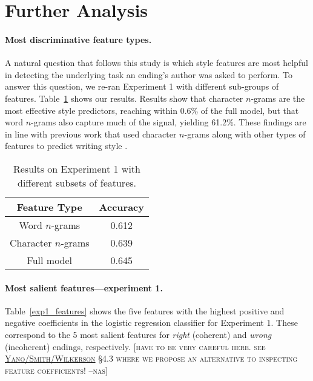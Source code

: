 \documentclass[11pt,a4paper]{article}
\newcommand{\tabref}[1]{Table~\ref{#1}}
\newcommand{\isection}[2]{\section{#1}\label{ssec:#2}}
\newcommand{\resolved}[1]{}
\newcommand{\nascomment}[1]{{\color{blue}\textsc{[#1 --nas]}}}
\begin{document}
\isection{Further Analysis}{Ablation}

 \resolved{\nascomment{these aren't just ablations, so I retitled}}

\paragraph{Most discriminative feature types.}
A natural question that follows this study is which style features are most
helpful in detecting the underlying task an ending's author was asked
to perform. 
To answer this question, we re-ran Experiment 1 with different sub-groups of features. 
\tabref{subgroups} shows our results. Results show that  character $n$-grams are the most effective style predictors, reaching within  0.6\% of the full model, but that word $n$-grams also capture much of the signal, yielding 61.2\%. 
These findings are in line with previous work that used character $n$-grams along with other types of features to predict writing  style \cite{Schwartz:2013}.


\begin{table}[!t]
\begin{center}
\begin{tabular}{|c|c|} \hline
{\bf Feature Type} & {\bf Accuracy}\\ \hline
Word $n$-grams & 0.612 \\ \hline
Character $n$-grams & 0.639 \\ \hline
Full model & 0.645 \\ \hline

\end{tabular}
\end{center}
\caption{\label{subgroups}
Results on Experiment 1 with different subsets of features.
}
\end{table}

\paragraph{Most salient features---experiment 1.}
\tabref{exp1_features} shows the five features with the highest positive and negative coefficients in the logistic regression classifier for Experiment 1. 
These correspond to the 5 most salient features for {\it right}
(coherent) and {\it wrong} (incoherent) endings,
respectively. \nascomment{have to be very careful here.  see
  \href{http://homes.cs.washington.edu/~nasmith/papers/yano+smith+wilkerson.naacl12.pdf}{Yano/Smith/Wilkerson}
  \S 4.3 where we propose an alternative to inspecting
  feature coefficients!}
\end{document}
